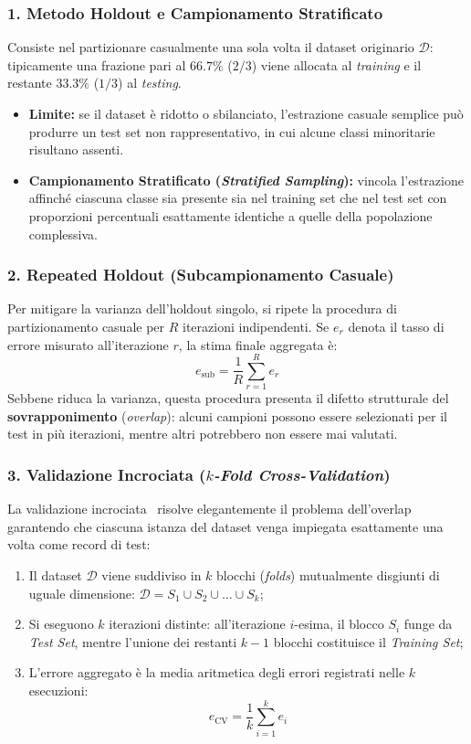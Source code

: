 \subsubsection{1. Metodo Holdout e Campionamento Stratificato}
Consiste nel partizionare casualmente una sola volta il dataset originario $\mathcal{D}$: tipicamente una frazione pari al $66.7\%$ ($2/3$) viene allocata al \textit{training} e il restante $33.3\%$ ($1/3$) al \textit{testing}.
\begin{itemize}
    \item \textbf{Limite:} se il dataset è ridotto o sbilanciato, l'estrazione casuale semplice può produrre un test set non rappresentativo, in cui alcune classi minoritarie risultano assenti.
    \item \textbf{Campionamento Stratificato (\textit{Stratified Sampling}):} vincola l'estrazione affinché ciascuna classe sia presente sia nel training set che nel test set con proporzioni percentuali esattamente identiche a quelle della popolazione complessiva.
\end{itemize}

\subsubsection{2. Repeated Holdout (Subcampionamento Casuale)}
Per mitigare la varianza dell'holdout singolo, si ripete la procedura di partizionamento casuale per $R$ iterazioni indipendenti. Se $e_r$ denota il tasso di errore misurato all'iterazione $r$, la stima finale aggregata è:
\begin{equation}
    e_{\text{sub}} = \frac{1}{R} \sum_{r=1}^R e_r
\end{equation}
Sebbene riduca la varianza, questa procedura presenta il difetto strutturale del \textbf{sovrapponimento} (\textit{overlap}): alcuni campioni possono essere selezionati per il test in più iterazioni, mentre altri potrebbero non essere mai valutati.

\subsubsection{3. Validazione Incrociata (\textit{$k$-Fold Cross-Validation})}
La validazione incrociata~\cite{kohavi1995} risolve elegantemente il problema dell'overlap garantendo che ciascuna istanza del dataset venga impiegata esattamente una volta come record di test:
\begin{enumerate}
    \item Il dataset $\mathcal{D}$ viene suddiviso in $k$ blocchi (\textit{folds}) mutualmente disgiunti di uguale dimensione: $\mathcal{D} = S_1 \cup S_2 \cup \dots \cup S_k$;
    \item Si eseguono $k$ iterazioni distinte: all'iterazione $i$-esima, il blocco $S_i$ funge da \textit{Test Set}, mentre l'unione dei restanti $k - 1$ blocchi costituisce il \textit{Training Set};
    \item L'errore aggregato è la media aritmetica degli errori registrati nelle $k$ esecuzioni:
    \begin{equation}
        e_{\text{CV}} = \frac{1}{k} \sum_{i=1}^k e_i
    \end{equation}
\end{enumerate}

